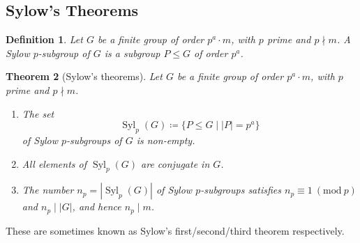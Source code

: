 \documentclass{article}
\theoremstyle{plain}\theoremheaderfont{\normalfont\itshape}\theorembodyfont{\rmfamily}\theoremseparator{.}\newtheorem*{rem}{Remark}\newtheorem*{ex}{Example}\newtheorem*{proof}{Proof}\newtheorem*{altp}{Alternative proof}\newtheorem*{nonex}{Non-Example}
\theoremstyle{plain}\theoremheaderfont{\normalfont\bfseries}\theorembodyfont{\rmfamily}\theoremseparator{.}\newtheorem{thm}{Theorem}[section]\newtheorem{lem}[thm]{Lemma}\newtheorem{prop}[thm]{Proposition}\newtheorem*{cor}{Corollary}\newtheorem{defn}[thm]{Definition}\newtheorem{clm}[thm]{Claim}\newtheorem{clminproof}{Claim}\newtheorem*{notn}{Notation}\newtheorem*{exer}{Exercise}\newtheorem*{lemnn}{Lemma}
\theoremstyle{break}\theoremheaderfont{\normalfont\itshape}\theorembodyfont{\rmfamily}\theoremseparator{.\medskip}\newtheorem*{proofskip}{Proof}\newtheorem*{exs}{Examples}\newtheorem*{rems}{Remarks}\newtheorem*{obs}{Observations}
\theoremstyle{break}\theoremheaderfont{\normalfont\bfseries}\theorembodyfont{\rmfamily}\theoremseparator{.\medskip}\newtheorem{lemskip}[thm]{Lemma}\newtheorem{defnskip}[thm]{Definition}\newtheorem{propskip}[thm]{Proposition}\newtheorem{thmskip}[thm]{Theorem}
\numberwithin{equation}{section}
\newcommand{\abs}[1]{\left|#1\right|}
\DeclareMathOperator{\Syl}{Syl}
\newcommand{\MOD}[1]{\ (\mathrm{mod} \ #1)}
\begin{document}
    \subsection{Sylow's Theorems}
    \begin{defn}
        Let \(G\) be a finite group of order \(p^a\cdot m\), with \(p\) prime and \(p\nmid m\). A \textit{Sylow \(p\)-subgroup} of \(G\) is a subgroup \(P\le G\) of order \(p^a\).
    \end{defn}
    \begin{thm}[Sylow's theorems]
        Let \(G\) be a finite group of order \(p^a\cdot m\), with \(p\) prime and \(p\nmid m\).
        \begin{enumerate}[topsep=0pt,label=(\roman*)]
            \item The set
            \[\Syl_p(G)\coloneqq\{P\le G\mid\abs{P}=p^a\}\]
            of Sylow \(p\)-subgroups of \(G\) is non-empty.
            \item All elements of \(\Syl_p(G)\) are conjugate in \(G\).
            \item The number \(n_p=\abs{\Syl_p(G)}\) of Sylow \(p\)-subgroups satisfies \(n_p\equiv 1\MOD{p}\) and \(n_p \mid\abs{G}\), and hence \(n_p\mid m\).
        \end{enumerate}
    \end{thm}
    These are sometimes known as Sylow's first/second/third theorem respectively.
\end{document}
